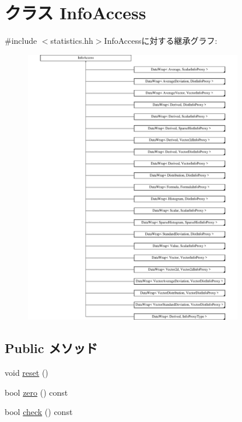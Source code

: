 \hypertarget{classStats_1_1InfoAccess}{
\section{クラス InfoAccess}
\label{classStats_1_1InfoAccess}
}


{\ttfamily \#include $<$statistics.hh$>$}InfoAccessに対する継承グラフ:\begin{figure}[H]
\begin{center}
\leavevmode
\includegraphics[height=12cm]{classStats_1_1InfoAccess}
\end{center}
\end{figure}
\subsection*{Public メソッド}
\begin{DoxyCompactItemize}
\item 
void \hyperlink{classStats_1_1InfoAccess_ad20897c5c8bd47f5d4005989bead0e55}{reset} ()
\item 
bool \hyperlink{classStats_1_1InfoAccess_a4e72b01b727d3165e75cba84eb507491}{zero} () const 
\item 
bool \hyperlink{classStats_1_1InfoAccess_a6ecddb2c44556b7acbc1723a968ff8bb}{check} () const 
\end{DoxyCompactItemize}
